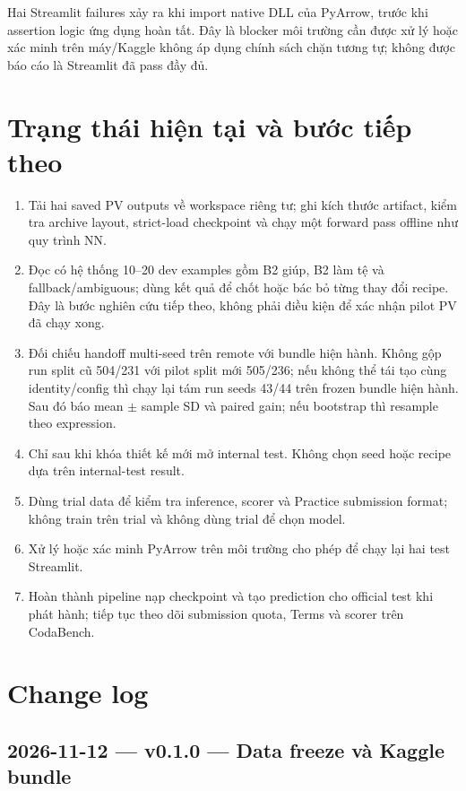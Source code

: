 \documentclass[11pt,a4paper]{article}
\begin{document}
Hai Streamlit failures xảy ra khi import native DLL của PyArrow, trước khi assertion logic ứng dụng hoàn tất. Đây là blocker môi trường cần được xử lý hoặc xác minh trên máy/Kaggle không áp dụng chính sách chặn tương tự; không được báo cáo là Streamlit đã pass đầy đủ.

\section{Trạng thái hiện tại và bước tiếp theo}

\begin{enumerate}
  \item Tải hai saved PV outputs về workspace riêng tư; ghi kích thước artifact, kiểm tra archive layout, strict-load checkpoint và chạy một forward pass offline như quy trình NN.
  \item Đọc có hệ thống 10--20 dev examples gồm B2 giúp, B2 làm tệ và fallback/ambiguous; dùng kết quả để chốt hoặc bác bỏ từng thay đổi recipe. Đây là bước nghiên cứu tiếp theo, không phải điều kiện để xác nhận pilot PV đã chạy xong.
  \item Đối chiếu handoff multi-seed trên remote với bundle hiện hành. Không gộp run split cũ 504/231 với pilot split mới 505/236; nếu không thể tái tạo cùng identity/config thì chạy lại tám run seeds 43/44 trên frozen bundle hiện hành. Sau đó báo mean $\pm$ sample SD và paired gain; nếu bootstrap thì resample theo expression.
  \item Chỉ sau khi khóa thiết kế mới mở internal test. Không chọn seed hoặc recipe dựa trên internal-test result.
  \item Dùng trial data để kiểm tra inference, scorer và Practice submission format; không train trên trial và không dùng trial để chọn model.
  \item Xử lý hoặc xác minh PyArrow trên môi trường cho phép để chạy lại hai test Streamlit.
  \item Hoàn thành pipeline nạp checkpoint và tạo prediction cho official test khi phát hành; tiếp tục theo dõi submission quota, Terms và scorer trên CodaBench.
\end{enumerate}

\section{Change log}

\subsection*{2026-11-12 --- v0.1.0 --- Data freeze và Kaggle bundle}
\end{document}
